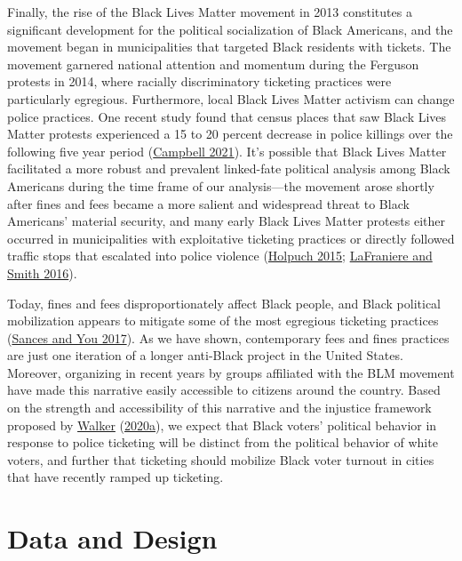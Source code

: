 \documentclass[
  12pt,
]{article}
\begin{document}
Finally, the rise of the Black Lives Matter movement in 2013 constitutes a significant development for the political socialization of Black Americans, and the movement began in municipalities that targeted Black residents with tickets. The movement garnered national attention and momentum during the Ferguson protests in 2014, where racially discriminatory ticketing practices were particularly egregious. Furthermore, local Black Lives Matter activism can change police practices. One recent study found that census places that saw Black Lives Matter protests experienced a 15 to 20 percent decrease in police killings over the following five year period (\protect\hyperlink{ref-Campbell2021}{Campbell 2021}). It's possible that Black Lives Matter facilitated a more robust and prevalent linked-fate political analysis among Black Americans during the time frame of our analysis---the movement arose shortly after fines and fees became a more salient and widespread threat to Black Americans' material security, and many early Black Lives Matter protests either occurred in municipalities with exploitative ticketing practices or directly followed traffic stops that escalated into police violence (\protect\hyperlink{ref-Holpuch2015}{Holpuch 2015}; \protect\hyperlink{ref-LaFraniere2016}{LaFraniere and Smith 2016}).

Today, fines and fees disproportionately affect Black people, and Black political mobilization appears to mitigate some of the most egregious ticketing practices (\protect\hyperlink{ref-Sances2017}{Sances and You 2017}). As we have shown, contemporary fees and fines practices are just one iteration of a longer anti-Black project in the United States. Moreover, organizing in recent years by groups affiliated with the BLM movement have made this narrative easily accessible to citizens around the country. Based on the strength and accessibility of this narrative and the injustice framework proposed by \protect\hyperlink{ref-Walker2020a}{Walker} (\protect\hyperlink{ref-Walker2020a}{2020a}), we expect that Black voters' political behavior in response to police ticketing will be distinct from the political behavior of white voters, and further that ticketing should mobilize Black voter turnout in cities that have recently ramped up ticketing.

\hypertarget{data-and-design}{%
\section*{Data and Design}\label{data-and-design}}
\end{document}
